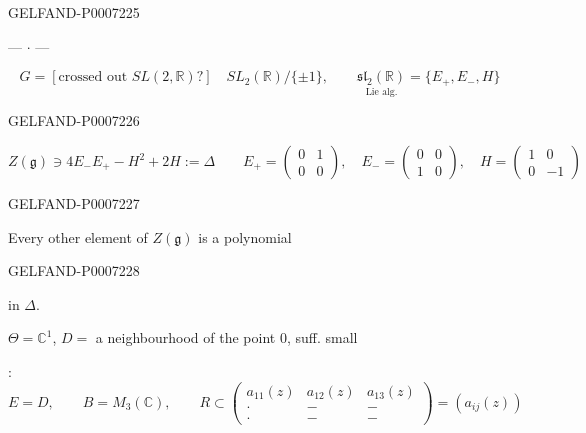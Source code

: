 \begin{GelfandAdjacentEvidence}{GELFAND-P000722}{5}


\begin{center}--- \(\cdot\) ---\end{center}

\[
G=[\text{crossed out }SL(2,\mathbb R)?]\quad SL_2(\mathbb R)/\{\pm1\},
\qquad
\underset{\text{Lie alg.}}{\mathfrak{sl}_2(\mathbb R)}=\{E_+,E_-,H\}
\]
\end{GelfandAdjacentEvidence}
\begin{GelfandAdjacentEvidence}{GELFAND-P000722}{6}

\[
Z(\mathfrak g)\ni 4E_-E_+-H^2+2H:=\Delta
\qquad
E_+=\begin{pmatrix}0&1\\0&0\end{pmatrix},\quad
E_-=\begin{pmatrix}0&0\\1&0\end{pmatrix},
\quad H=\begin{pmatrix}1&0\\0&-1\end{pmatrix}
\]
\end{GelfandAdjacentEvidence}
\begin{GelfandAdjacentEvidence}{GELFAND-P000722}{7}


Every other element of \(Z(\mathfrak g)\) is a polynomial
\end{GelfandAdjacentEvidence}
\begin{GelfandAdjacentEvidence}{GELFAND-P000722}{8}

in \(\Delta\).

\(\Theta=\mathbb C^1\), \(D={}\) a neighbourhood of the point \(0\), suff. small
\end{GelfandAdjacentEvidence}


:
\[
E=D,\qquad B=M_3(\mathbb C),\qquad
R\subset
\begin{pmatrix}
a_{11}(z)&a_{12}(z)&a_{13}(z)\\
\cdot&-&-\\
\cdot&-&-
\end{pmatrix}
=(a_{ij}(z))
\]


